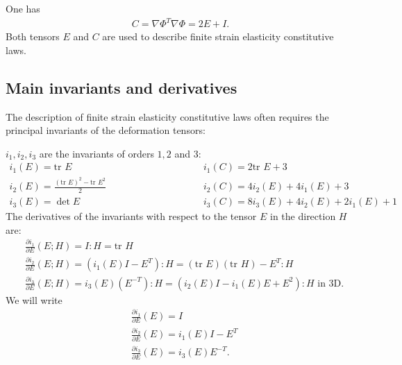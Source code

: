 \documentclass[a4paper,11pt,english]{sphinxmanual}
\begin{document}
One has
\begin{equation*}
\begin{split}C = \nabla\Phi^T\nabla\Phi = 2 E + I.\end{split}
\end{equation*}
Both tensors \(E\) and \(C\) are used to describe finite strain elasticity constitutive laws.


\subsection{Main invariants and derivatives}
\label{\detokenize{userdoc/model_nonlinear_elasticity:main-invariants-and-derivatives}}
The description of finite strain elasticity constitutive laws often requires the principal invariants of the deformation tensors:

\(i_1,i_2,i_3\) are the invariants of orders \(1,2\) and \(3\):
\begin{equation*}
\begin{split}i_1( E) = \mbox{tr } E \hspace{5cm} &i_1( C) = 2\mbox{tr } E + 3\\
i_2( E) = \frac{(\mbox{tr } E)^2 - \mbox{tr } E^2}{2}\quad\hspace{3cm}& i_2( C)=4i_2( E)+4i_1( E)+3\\
i_3( E) = \det E \hspace{5cm} &i_3( C) = 8i_3( E) + 4i_2( E) + 2i_1( E) + 1\end{split}
\end{equation*}
The derivatives of the invariants with respect to the tensor \(E\) in the direction \(H\) are:
\begin{equation*}
\begin{split}&\frac{\partial i_1}{\partial E}(E;H) = I:H = \mbox{tr } H\\
&\frac{\partial i_2}{\partial E}(E;H) = (i_1( E)I -  E^T):H = (\mbox{tr }  E)(\mbox{tr } H) -  E^T:H\\
&\frac{\partial i_3}{\partial E}(E;H) = i_3( E)(E^{-T}):H  = (i_2( E)I - i_1( E) E +  E^2):H \mbox{ in 3D}.\end{split}
\end{equation*}
We will write
\begin{equation*}
\begin{split}&\frac{\partial i_1}{\partial E}(E) = I\\
&\frac{\partial i_2}{\partial E}(E) = i_1( E)I -  E^T\\
&\frac{\partial i_3}{\partial E}(E) = i_3( E)E^{-T}.\end{split}
\end{equation*}
\end{document}
